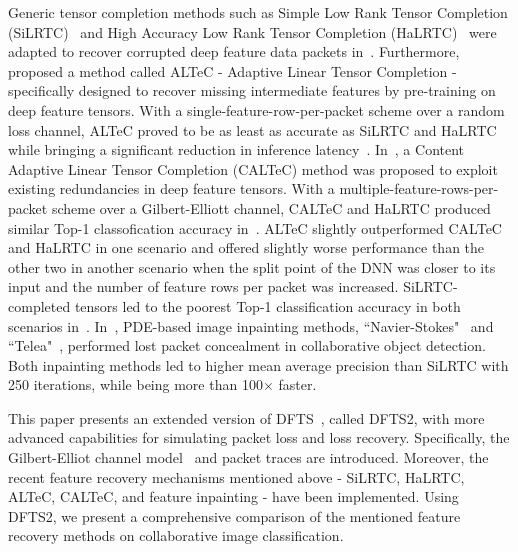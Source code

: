 \documentclass[conference,letterpaper]{IEEEtran}
\begin{document}
Generic tensor completion methods such as Simple Low Rank Tensor Completion (SiLRTC)~\cite{liu2012tensor} and High Accuracy Low Rank Tensor Completion (HaLRTC)~\cite{liu2012tensor} were adapted to recover corrupted deep feature data packets in~\cite{Bragile2020,CALTeC_ICIP_2021,Bajic2021objdet}. Furthermore,~\cite{Bragile2020} proposed a method called ALTeC - Adaptive Linear Tensor Completion - specifically designed to recover missing intermediate features by pre-training on deep feature tensors. With a single-feature-row-per-packet scheme over a random loss channel, ALTeC proved to be as least as accurate as SiLRTC and HaLRTC while bringing a significant reduction in inference latency~\cite{Bragile2020}. In~\cite{CALTeC_ICIP_2021}, a Content Adaptive Linear Tensor Completion (CALTeC) method was proposed to exploit existing redundancies in deep feature tensors. With a multiple-feature-rows-per-packet scheme over a Gilbert-Elliott channel, CALTeC and HaLRTC produced similar Top-1 classofication accuracy in~\cite{CALTeC_ICIP_2021}. ALTeC slightly outperformed CALTeC and HaLRTC in one scenario and offered slightly worse performance than the other two in another scenario when the split point of the DNN was closer to its input and the number of feature rows per packet was increased. SiLRTC-completed tensors led to the poorest Top-1 classification accuracy in both scenarios in~\cite{CALTeC_ICIP_2021}. In~\cite{Bajic2021objdet}, PDE-based image inpainting methods,  ``Navier-Stokes"~\cite{navierstokes} and ``Telea"~\cite{telea2004image}, performed lost packet concealment in collaborative object detection. Both inpainting methods led to higher mean average precision than SiLRTC with 250 iterations, while being more than 100$\times$ faster. 

This paper presents an extended version of DFTS~\cite{unnibhavi2018dfts}, called DFTS2, with more advanced capabilities for simulating packet loss and loss recovery. Specifically, the Gilbert-Elliot channel model~\cite{5755057} and packet traces are introduced. Moreover, the recent feature recovery mechanisms mentioned above - SiLRTC, HaLRTC, ALTeC, CALTeC, and feature inpainting - have been implemented. Using DFTS2, we present a comprehensive comparison of the mentioned feature recovery methods on collaborative image classification.
\end{document}
